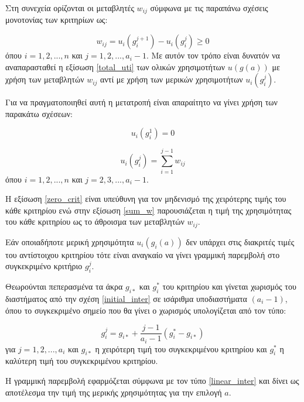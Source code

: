\documentclass[11pt,a4paper,titlepage]{article}
\numberwithin{equation}{section}
\begin{document}
Στη συνεχεία ορίζονται οι μεταβλητές $w_{ij}$ σύμφωνα με τις παραπάνω σχέσεις μονοτονίας των κριτηρίων ως:

\begin{equation}\label{def_w}
	w_{ij} = u_{i}(g^{j+1}_{i}) - u_{i}(g^{j}_{i}) \geq 0
\end{equation}
όπου $i = 1,2,...,n$ και $j = 1,2,...,a_{i}-1$. Με αυτόν τον τρόπο είναι δυνατόν να αναπαρασταθεί η εξίσωση \ref{total_uti} των ολικών χρησιμοτήτων $u(g(a))$ με χρήση των μεταβλητών $w_{ij}$ αντί με χρήση των μερικών χρησιμοτήτων $u_{i}(g^{j}_{i})$. 

Για να πραγματοποιηθεί αυτή η μετατροπή είναι απαραίτητο να γίνει χρήση των παρακάτω σχέσεων:

\begin{equation}\label{zero_crit}
	u_{i}(g^{1}_{i}) = 0
\end{equation}

\begin{equation}\label{sum_w}
	u_{i}(g^{j}_{i}) = \sum_{i=1}^{j-1} w_{ij}
\end{equation}
όπου $i = 1,2,...,n$ και $j = 2,3,...,a_{i}-1$.

\newpage

Η εξίσωση \ref{zero_crit} είναι υπεύθυνη για τον μηδενισμό της χειρότερης τιμής του κάθε κριτηρίου ενώ στην εξίσωση \ref{sum_w} παρουσιάζεται η τιμή της χρησιμότητας του κάθε κριτηρίου ως το άθροισμα των μεταβλητών $w_{ij}$.  

Εάν οποιαδήποτε μερική χρησιμότητα $u_{i}(g_{i}(a))$ δεν υπάρχει στις διακριτές τιμές του αντίστοιχου κριτηρίου τότε είναι αναγκαίο να γίνει γραμμική παρεμβολή στο συγκεκριμένο κριτήριο $g_{i}^{j}$. 

Θεωρούνται πεπερασμένα τα άκρα $g_{i*}$ και $g^{*}_{i}$ του κριτηρίου και γίνεται χωρισμός του διαστήματος από την σχέση \ref{initial_inter} σε ισάριθμα υποδιαστήματα $(a_{i}-1)$, όπου το συγκεκριμένο σημείο που θα γίνει ο χωρισμός υπολογίζεται από τον τύπο:

\begin{equation}
	g_{i}^{j} = g_{i*} + \frac{j-1}{a_{i}-1}(g^{*}_{i}-g_{i*})
\end{equation}
για $j = 1,2,...,a_{i}$ και $g_{i*}$ η χειρότερη τιμή του συγκεκριμένου κριτηρίου και $g^{*}_{i}$ η καλύτερη τιμή του συγκεκριμένου κριτηρίου.

Η γραμμική παρεμβολή εφαρμόζεται σύμφωνα με τον τύπο \ref{linear_inter} και δίνει ως αποτέλεσμα την τιμή της μερικής χρησιμότητας για την επιλογή $a$.
\end{document}
